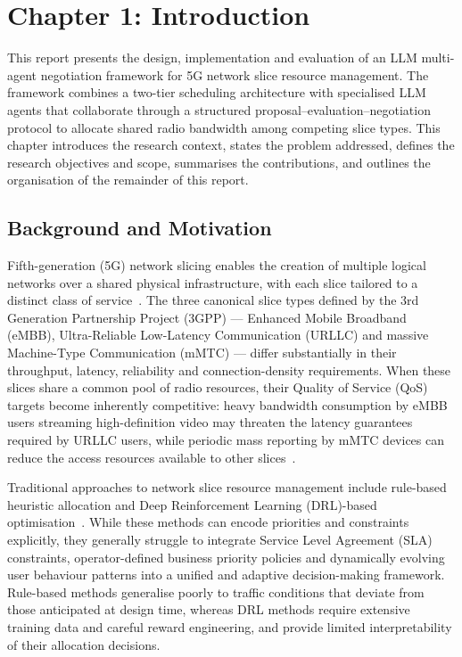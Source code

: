 \section*{Chapter 1: Introduction}
\setcounter{section}{1} \setcounter{subsection}{0}
 {}

This report presents the design, implementation and evaluation of an LLM multi-agent negotiation framework for 5G network slice resource management. The framework combines a two-tier scheduling architecture with specialised LLM agents that collaborate through a structured proposal--evaluation--negotiation protocol to allocate shared radio bandwidth among competing slice types. This chapter introduces the research context, states the problem addressed, defines the research objectives and scope, summarises the contributions, and outlines the organisation of the remainder of this report.

\subsection{Background and Motivation}

Fifth-generation (5G) network slicing enables the creation of multiple logical networks over a shared physical infrastructure, with each slice tailored to a distinct class of service~\cite{afolabi2018slicing}. The three canonical slice types defined by the 3rd Generation Partnership Project (3GPP) --- Enhanced Mobile Broadband (eMBB), Ultra-Reliable Low-Latency Communication (URLLC) and massive Machine-Type Communication (mMTC) --- differ substantially in their throughput, latency, reliability and connection-density requirements. When these slices share a common pool of radio resources, their Quality of Service (QoS) targets become inherently competitive: heavy bandwidth consumption by eMBB users streaming high-definition video may threaten the latency guarantees required by URLLC users, while periodic mass reporting by mMTC devices can reduce the access resources available to other slices~\cite{afolabi2018slicing}.

Traditional approaches to network slice resource management include rule-based heuristic allocation and Deep Reinforcement Learning (DRL)-based optimisation~\cite{li2018drl,sciancalepore2019rlnsb}. While these methods can encode priorities and constraints explicitly, they generally struggle to integrate Service Level Agreement (SLA) constraints, operator-defined business priority policies and dynamically evolving user behaviour patterns into a unified and adaptive decision-making framework. Rule-based methods generalise poorly to traffic conditions that deviate from those anticipated at design time, whereas DRL methods require extensive training data and careful reward engineering, and provide limited interpretability of their allocation decisions.

